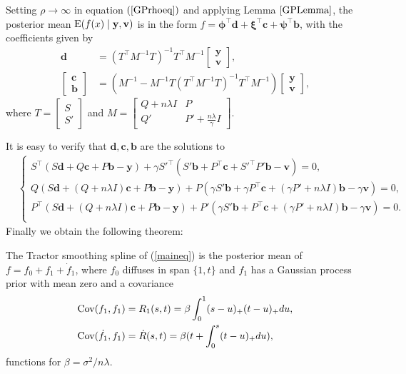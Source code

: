 Setting $\rho \rightarrow \infty$ in equation $(\ref{GPrhoeq})$ and applying Lemma $\ref{GPLemma}$, the posterior mean $\mathrm{E} (f(x)\mid \mathbf{y},\mathbf{v})$ is in the form $f  = \mathbf{\phi}^\top \mathbf{d}+\mathbf{\xi}^\top \mathbf{c}+\mathbf{\psi}^\top \mathbf{b}$, with the coefficients given by
\begin{align*} 
\mathbf{d}&=(T^\top M^{-1}T)^{-1}T^\top M^{-1}\begin{bmatrix}\mathbf{y} \\ \mathbf{v} \end{bmatrix},\\
\begin{bmatrix}\mathbf{c}\\\mathbf{b}\end{bmatrix} &=
(M^{-1}-M^{-1}T(T^\top M^{-1} T)^{-1}T^\top M^{-1})\begin{bmatrix}\mathbf{y}\\ \mathbf{v} \end{bmatrix},
\end{align*} where $T=\begin{bmatrix} S\\S' \end{bmatrix}$ and $M=\begin{bmatrix}
Q+n\lambda I& P\\
Q'& P'+\frac{n\lambda}{\gamma}I
\end{bmatrix}$.


It is easy to verify that $\mathbf{d},\mathbf{c},\mathbf{b}$ are the solutions to
\begin{align*}
&\begin{cases}
S^\top (S\mathbf{d} +Q\mathbf{c}+P\mathbf{b}-\mathbf{y}) +\gamma S'^\top( S'\mathbf{b}+ P^\top \mathbf{c}+S'^\top P'\mathbf{b}-\mathbf{v})=0, \\
Q(S\mathbf{d}+(Q+n\lambda I)\mathbf{c}+P\mathbf{b}-\mathbf{y}) + P ( \gamma S' \mathbf{b} +  \gamma P^\top \mathbf{c}+ (\gamma P'+n\lambda I) \mathbf{b}- \gamma \mathbf{v})=0, \\
P^\top (S\mathbf{d}+(Q+n\lambda I) \mathbf{c} +P\mathbf{b}-\mathbf{y})+P'(\gamma S'\mathbf{b}+P^\top \mathbf{c}+(\gamma P'+n\lambda I)\mathbf{b}- \gamma\mathbf{v})=0. \\
\end{cases}
\end{align*}
Finally we obtain the following theorem: 
\begin{theorem}
The Tractor smoothing spline of (\ref{maineq}) is the posterior
mean of $f=f_0+f_1 + \dot{f}_1$, where $f_0$ diffuses in span $\{ 1,t\}$ and $f_1$ has a Gaussian process prior with mean zero and a covariance 
\begin{align*}
\mathrm{Cov} (f_1,f_1)   &= R_1(s,t)   =\beta \int_{0}^{1} (s-u)_+(t-u)_+du, \\
\mathrm{Cov} (\dot{f}_1,f_1)  &= \dot{R}(s,t) =\beta (t+\int_0^s(t-u)_+du ),
\end{align*}
functions for $\beta = \sigma^2/n\lambda$.
\end{theorem}



